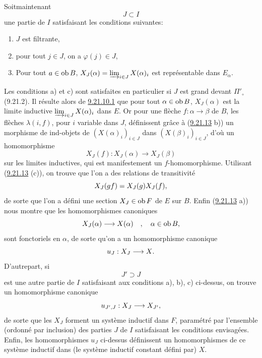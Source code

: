 \documentclass[10pt]{../fichiers-configuration-latex/smfart}
\def\labelenumi{(\theenumi)}
\begin{document}
\subsubsection{}
Soit\pageoriginale maintenant
$$
J\subset I
$$
une partie de $I$ satisfaisant les conditions suivantes:
\begin{enumerate}
\renewcommand{\theenumi}{\alph{enumi}}
\renewcommand{\labelenumi}{\theenumi)}
\item $J$ est filtrante,

\item pour tout $j\in J$, on a $\varphi(j)\in J$,

\item Pour tout $a\in \operatorname{ob} B$, $X_J(\alpha)=\varinjlim_{i\in
J}X(\alpha)_i$ est représentable dans $E_{\alpha}$.
\end{enumerate}
Les conditions a) et c) sont satisfaites en particulier si $J$ est
grand devant $\Pi'_\circ$ (9.21.2). Il résulte alors de
\hyperref[I.cor9.21.10.1]{9.21.10.1}
que pour tout $\alpha\in \operatorname{ob} B$, $X_J(\alpha)$ est la limite
inductive $\varinjlim_{i\in J}X(\alpha)_i$ dans $E$. Or pour une
flèche $f:\alpha\rightarrow \beta$ de $B$, les flèches
$\lambda(i,f)$, pour $i$ variable dans $J$, définissent grâce à
(\hyperref[I.lem9.21.13]{9.21.13} b)) un morphisme de ind-objets de $(X(\alpha)_i)_{i\in J}$
dans $(X(\beta)_i)_{i\in J}$, d'où un homomorphisme
$$
X_J(f):X_J(\alpha)\rightarrow X_J(\beta)
$$
sur les limites inductives, qui est manifestement un
$f$-homomorphisme. Utilisant (\hyperref[I.lem9.21.13]{9.21.13} (c)), on trouve que l'on a des
relations de transitivité
$$
X_J(gf)=X_J(g)X_J(f){},
$$
de sorte que l'on a défini une section $X_J\in \operatorname{ob} F$ de $E$ sur
$B$. Enfin (\hyperref[I.lem9.21.13]{9.21.13} a)) nous montre que les homomorphismes
canoniques
$$
X_J(\alpha)\longrightarrow X(\alpha)\quad,\quad \alpha\in \operatorname{ob} B{},
$$
sont fonctoriels en $\alpha$, de sorte qu'on a un homomorphisme
canonique
$$
u_J:X_J\longrightarrow X{}.
$$
D'autre\pageoriginale part, si
$$
J'\supset J
$$
est une autre partie de $I$ satisfaisant aux conditions a), b), c)
ci-dessus, on trouve un homomorphisme canonique
$$
u_{J',J}:X_J\longrightarrow X_{J'}{},
$$
de sorte que les $X_J$ forment un système inductif dans $F$,
paramétré par l'ensemble (ordonné par inclusion) des parties $J$ de
$I$ satisfaisant les conditions envisagées. Enfin, les
homomorphismes $u_J$ ci-dessus définissent un homomorphismes de ce
système inductif dans (le système inductif constant défini par) $X$.
\end{document}
